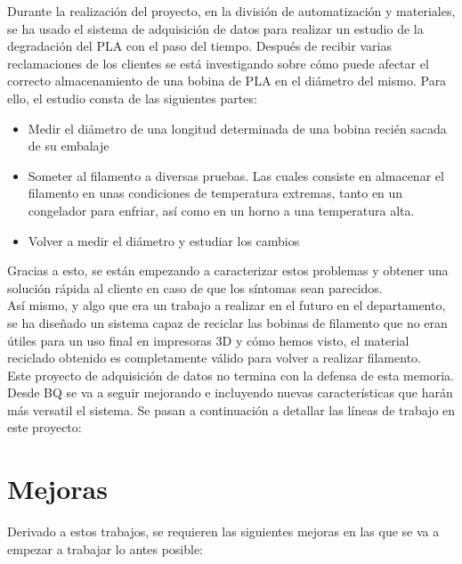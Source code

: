 Durante la realización del proyecto, en la división de automatización y materiales, se ha usado el sistema de adquisición de datos para realizar un estudio de la degradación del PLA con el paso del tiempo. Después de recibir varias reclamaciones de los clientes se está investigando sobre cómo puede afectar el correcto almacenamiento de una bobina de PLA en el diámetro del mismo. Para ello, el estudio consta de las siguientes partes:

\begin{itemize}
	\item{Medir el diámetro de una longitud determinada de una bobina recién sacada de su embalaje}
	\item{Someter al filamento a diversas pruebas. Las cuales consiste en almacenar el filamento en unas condiciones de temperatura extremas, tanto en un congelador para enfriar, así como en un horno a una temperatura alta.}
	\item{Volver a medir el diámetro y estudiar los cambios}
\end{itemize}

Gracias a esto, se están empezando a caracterizar estos problemas y obtener una solución rápida al cliente en caso de que los síntomas sean parecidos.\\

Así mismo, y algo que era un trabajo a realizar en el futuro en el departamento, se ha diseñado un sistema capaz de reciclar las bobinas de filamento que no eran útiles para un uso final en impresoras 3D y cómo hemos visto, el material reciclado obtenido es completamente válido para volver a realizar filamento.\\

Este proyecto de adquisición de datos no termina con la defensa de esta memoria. Desde BQ se va a seguir mejorando e incluyendo nuevas características que harán más versatil el sistema. Se pasan a continuación a detallar las líneas de trabajo en este proyecto:


\section{Mejoras}
Derivado a estos trabajos, se requieren las siguientes mejoras en las que se va a empezar a trabajar lo antes posible:

